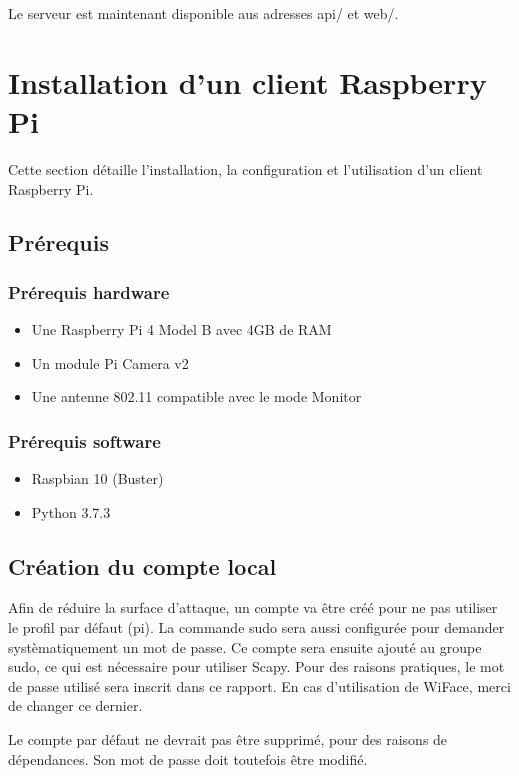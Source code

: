 Le serveur est maintenant disponible aus adresses api/ et web/.

\section{Installation d'un client Raspberry Pi}
Cette section détaille l'installation, la configuration et l'utilisation d'un client Raspberry Pi.

\subsection{Prérequis}

\subsubsection{Prérequis hardware}
\begin{itemize}
    \item Une Raspberry Pi 4 Model B avec 4GB de RAM
    \item Un module Pi Camera v2
    \item Une antenne 802.11 compatible avec le mode Monitor
\end{itemize}

\subsubsection{Prérequis software}
\begin{itemize}
    \item Raspbian 10 (Buster)
    \item Python 3.7.3
\end{itemize}

\subsection{Création du compte local}
Afin de réduire la surface d'attaque, un compte va être créé pour ne pas utiliser
le profil par défaut (pi).
La commande sudo sera aussi configurée pour demander systèmatiquement un mot de passe.
Ce compte sera ensuite ajouté au groupe sudo, ce qui est nécessaire pour utiliser Scapy.
Pour des raisons pratiques, le mot de passe utilisé sera inscrit dans ce rapport. En cas d'utilisation de WiFace, merci de changer ce dernier.

Le compte par défaut ne devrait pas être supprimé, pour des raisons
de dépendances. Son mot de passe doit toutefois être modifié.

